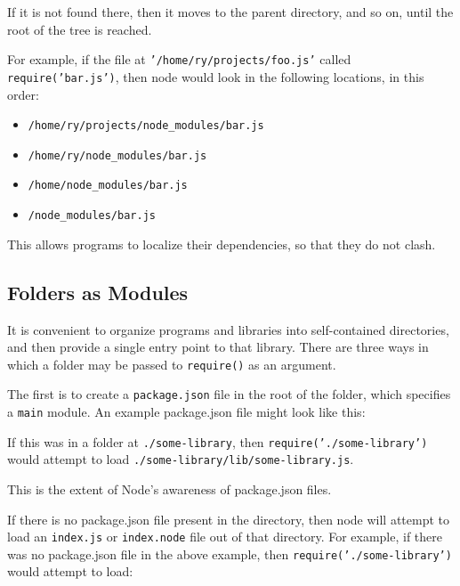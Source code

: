 If it is not found there, then it moves to the parent directory, and so
on, until the root of the tree is reached.

For example, if the file at \texttt{'/home/ry/projects/foo.js'} called
\texttt{require('bar.js')}, then node would look in the following
locations, in this order:

\begin{itemize}
\item
  \texttt{/home/ry/projects/node\_modules/bar.js}
\item
  \texttt{/home/ry/node\_modules/bar.js}
\item
  \texttt{/home/node\_modules/bar.js}
\item
  \texttt{/node\_modules/bar.js}
\end{itemize}

This allows programs to localize their dependencies, so that they do not
clash.

\subsection{Folders as Modules}

It is convenient to organize programs and libraries into self-contained
directories, and then provide a single entry point to that library.
There are three ways in which a folder may be passed to
\texttt{require()} as an argument.

The first is to create a \texttt{package.json} file in the root of the
folder, which specifies a \texttt{main} module. An example package.json
file might look like this:

\begin{Shaded}
\begin{Highlighting}[]
\NormalTok{\{ } \NormalTok{: }\NormalTok{,}
   \NormalTok{: } \NormalTok{\}}
\end{Highlighting}
\end{Shaded}

If this was in a folder at \texttt{./some-library}, then
\texttt{require('./some-library')} would attempt to load
\texttt{./some-library/lib/some-library.js}.

This is the extent of Node's awareness of package.json files.

If there is no package.json file present in the directory, then node
will attempt to load an \texttt{index.js} or \texttt{index.node} file
out of that directory. For example, if there was no package.json file in
the above example, then \texttt{require('./some-library')} would attempt
to load:

